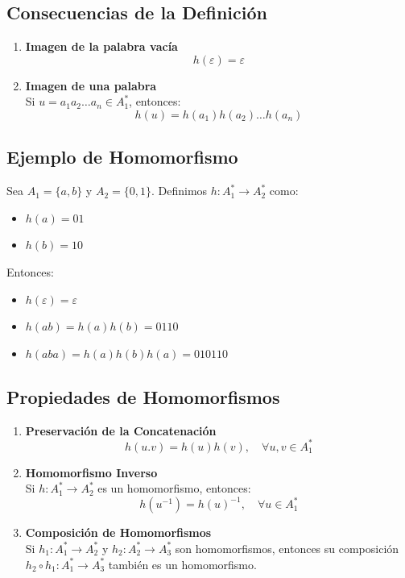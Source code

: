\documentclass[12pt]{report} %
\providecommand{\tightlist}{%
  \setlength{\itemsep}{0pt}\setlength{\parskip}{0pt}}
\begin{document}
\hypertarget{consecuencias-de-la-definiciuxf3n}{%
\subsection{Consecuencias de la
Definición}\label{consecuencias-de-la-definiciuxf3n}}

\begin{enumerate}
\def\labelenumi{\arabic{enumi}.}
\item
  \textbf{Imagen de la palabra vacía}\\
  \[
   h(\varepsilon) = \varepsilon
   \]
\item
  \textbf{Imagen de una palabra}\\
  Si \(u = a_1a_2 \ldots a_n \in A_1^*\), entonces: \[
   h(u) = h(a_1)h(a_2) \ldots h(a_n)
   \]
\end{enumerate}

\hypertarget{ejemplo-de-homomorfismo}{%
\subsection{Ejemplo de Homomorfismo}\label{ejemplo-de-homomorfismo}}

Sea \(A_1 = \{a, b\}\) y \(A_2 = \{0, 1\}\). Definimos
\(h : A_1^* \to A_2^*\) como:

\begin{itemize}
\tightlist
\item
  \(h(a) = 01\)
\item
  \(h(b) = 10\)
\end{itemize}

Entonces:

\begin{itemize}
\tightlist
\item
  \(h(\varepsilon) = \varepsilon\)
\item
  \(h(ab) = h(a)h(b) = 0110\)
\item
  \(h(aba) = h(a)h(b)h(a) = 010110\)
\end{itemize}

\hypertarget{propiedades-de-homomorfismos}{%
\subsection{Propiedades de
Homomorfismos}\label{propiedades-de-homomorfismos}}

\begin{enumerate}
\def\labelenumi{\arabic{enumi}.}
\item
  \textbf{Preservación de la Concatenación}\\
  \[
   h(u.v) = h(u)h(v), \quad \forall u, v \in A_1^*
   \]
\item
  \textbf{Homomorfismo Inverso}\\
  Si \(h : A_1^* \to A_2^*\) es un homomorfismo, entonces: \[
   h(u^{-1}) = h(u)^{-1}, \quad \forall u \in A_1^*
   \]
\item
  \textbf{Composición de Homomorfismos}\\
  Si \(h_1 : A_1^* \to A_2^*\) y \(h_2 : A_2^* \to A_3^*\) son
  homomorfismos, entonces su composición
  \(h_2 \circ h_1 : A_1^* \to A_3^*\) también es un homomorfismo.
\end{enumerate}
\end{document}
